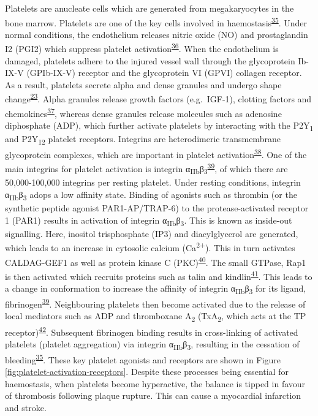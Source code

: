\documentclass[11pt,twoside]{bristolthesis}
\begin{document}
Platelets are anucleate cells which are generated from megakaryocytes in the bone marrow. Platelets are one of the key cells involved in haemostasis\textsuperscript{\protect\hyperlink{ref-Rivera2009}{35}}. Under normal conditions, the endothelium releases nitric oxide (NO) and prostaglandin I2 (PGI2) which suppress platelet activation\textsuperscript{\protect\hyperlink{ref-Yau2015}{36}}. When the endothelium is damaged, platelets adhere to the injured vessel wall through the glycoprotein Ib-IX-V (GPIb-IX-V) receptor and the glycoprotein VI (GPVI) collagen receptor. As a result, platelets secrete alpha and dense granules and undergo shape change\textsuperscript{\protect\hyperlink{ref-Badimon2012}{23}}. Alpha granules release growth factors (e.g.~IGF-1), clotting factors and chemokines\textsuperscript{\protect\hyperlink{ref-Gear2003}{37}}, whereas dense granules release molecules such as adenosine diphosphate (ADP), which further activate platelets by interacting with the P2Y\textsubscript{1} and P2Y\textsubscript{12} platelet receptors. Integrins are heterodimeric transmembrane glycoprotein complexes, which are important in platelet activation\textsuperscript{\protect\hyperlink{ref-Durrant2017a}{38}}. One of the main integrins for platelet activation is integrin α\textsubscript{IIb}β\textsubscript{3}\textsuperscript{\protect\hyperlink{ref-Huang2019}{39}}, of which there are 50,000-100,000 integrins per resting platelet. Under resting conditions, integrin α\textsubscript{IIb}β\textsubscript{3} adops a low affinity state. Binding of agonists such as thrombin (or the synthetic peptide agonist PAR1-AP/TRAP-6) to the protease-activated receptor 1 (PAR1) results in activation of integrin α\textsubscript{IIb}β\textsubscript{3}. This is known as inside-out signalling. Here, inositol trisphosphate (IP3) and diacylglycerol are generated, which leads to an increase in cytosolic calcium (Ca\textsuperscript{2+}). This in turn activates CALDAG-GEF1 as well as protein kinase C (PKC)\textsuperscript{\protect\hyperlink{ref-Mehrbod2013}{40}}. The small GTPase, Rap1 is then activated which recruits proteins such as talin and kindlin\textsuperscript{\protect\hyperlink{ref-Durrant2017}{41}}. This leads to a change in conformation to increase the affinity of integrin α\textsubscript{IIb}β\textsubscript{3} for its ligand, fibrinogen\textsuperscript{\protect\hyperlink{ref-Huang2019}{39}}. Neighbouring platelets then become activated due to the release of local mediators such as ADP and thromboxane A\textsubscript{2} (TxA\textsubscript{2}, which acts at the TP receptor)\textsuperscript{\protect\hyperlink{ref-Offermanns2006}{42}}. Subsequent fibrinogen binding results in cross-linking of activated platelets (platelet aggregation) via integrin α\textsubscript{IIb}β\textsubscript{3}, resulting in the cessation of bleeding\textsuperscript{\protect\hyperlink{ref-Rivera2009}{35}}. These key platelet agonists and receptors are shown in Figure \ref{fig:platelet-activation-receptors}. Despite these processes being essential for haemostasis, when platelets become hyperactive, the balance is tipped in favour of thrombosis following plaque rupture. This can cause a myocardial infarction and stroke.
\end{document}
